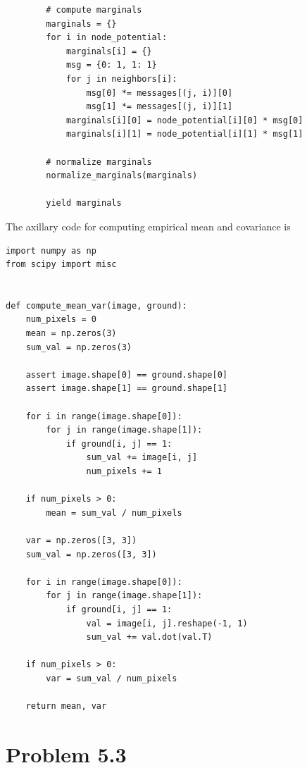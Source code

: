 \documentclass{article}
\begin{document}
\begin{lstlisting}
        # compute marginals
        marginals = {}
        for i in node_potential:
            marginals[i] = {}
            msg = {0: 1, 1: 1}
            for j in neighbors[i]:
                msg[0] *= messages[(j, i)][0]
                msg[1] *= messages[(j, i)][1]
            marginals[i][0] = node_potential[i][0] * msg[0]
            marginals[i][1] = node_potential[i][1] * msg[1]

        # normalize marginals
        normalize_marginals(marginals)

        yield marginals

\end{lstlisting}

The axillary code for computing empirical mean and covariance is 
\lstset{language=Python}
\lstset{frame=lines}
\lstset{basicstyle=\footnotesize}
\begin{lstlisting}
import numpy as np
from scipy import misc


def compute_mean_var(image, ground):
    num_pixels = 0
    mean = np.zeros(3)
    sum_val = np.zeros(3)

    assert image.shape[0] == ground.shape[0]
    assert image.shape[1] == ground.shape[1]

    for i in range(image.shape[0]):
        for j in range(image.shape[1]):
            if ground[i, j] == 1:
                sum_val += image[i, j]
                num_pixels += 1

    if num_pixels > 0:
        mean = sum_val / num_pixels

    var = np.zeros([3, 3])
    sum_val = np.zeros([3, 3])

    for i in range(image.shape[0]):
        for j in range(image.shape[1]):
            if ground[i, j] == 1:
                val = image[i, j].reshape(-1, 1)
                sum_val += val.dot(val.T)

    if num_pixels > 0:
        var = sum_val / num_pixels

    return mean, var

\end{lstlisting}
\pagebreak

\section*{Problem 5.3}
\end{document}
